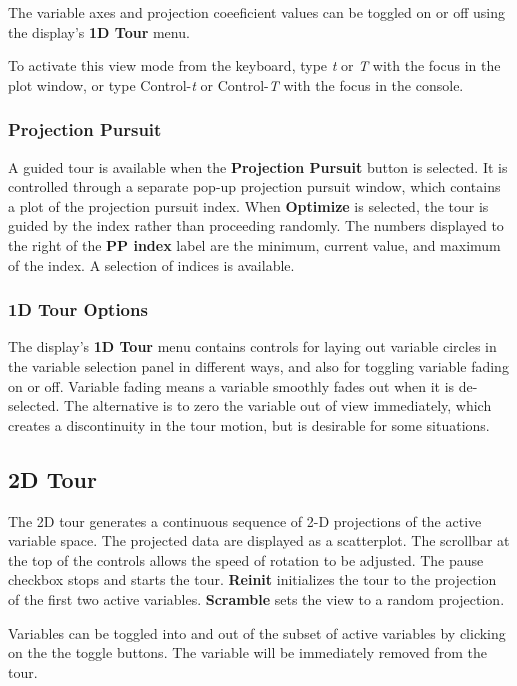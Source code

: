 \documentclass[11pt]{article}
\def\Widget#1{\textbf{#1}}
\begin{document}
The variable axes and projection coeeficient values can be toggled on
or off using the display's \Widget{1D Tour} menu.

To activate this view mode from the keyboard, type {\em t} or {\em T}
with the focus in the plot window, or type Control-{\em t} or
Control-{\em T} with the focus in the console.

\subsubsection{Projection Pursuit}

A guided tour is available when the \Widget{Projection Pursuit} button
is selected. It is controlled through a separate pop-up projection
pursuit window, which contains a plot of the projection pursuit index.
When \Widget{Optimize} is selected, the tour is guided by the index
rather than proceeding randomly.  The numbers displayed to the right
of the \Widget{PP index} label are the minimum, current value, and
maximum of the index.  A selection of indices is available.

\subsubsection{1D Tour Options}

The display's \Widget{1D Tour} menu contains controls for laying out
variable circles in the variable selection panel in different ways,
and also for toggling variable fading on or off. Variable fading means
a variable smoothly fades out when it is de-selected. The alternative
is to zero the variable out of view immediately, which creates a
discontinuity in the tour motion, but is desirable for some
situations.

\subsection{2D Tour}
\label{slbl:2DTour}

The 2D tour generates a continuous sequence of 2-D projections of the
active variable space. The projected data are displayed as a
scatterplot. The scrollbar at the top of the controls allows the speed
of rotation to be adjusted. The pause checkbox stops and starts the
tour. \Widget{Reinit} initializes the tour to the projection of the
first two active variables. \Widget{Scramble} sets the view to a
random projection.

Variables can be toggled into and out of the subset of active
variables by clicking on the the toggle buttons. The variable will be
immediately removed from the tour. 
\end{document}
